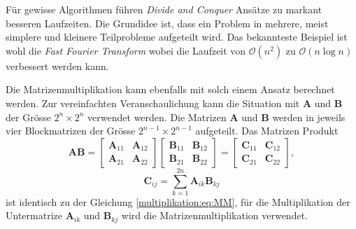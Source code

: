 F\"ur gewisse Algorithmen f\"uhren \textit{Divide and Conquer}  Ans\"atze \cite{multiplikation:DAC} zu markant besseren Laufzeiten.
Die Grundidee ist, dass ein Problem in mehrere, meist simplere und kleinere Teilprobleme aufgeteilt wird.
Das bekannteste Beispiel ist wohl die \textit{Fast Fourier Transform} wobei die Laufzeit von $\mathcal{O} (n^2)$ zu $\mathcal{O}(n \log n)$ verbessert werden kann.

Die Matrizenmultiplikation kann ebenfalls mit solch einem Ansatz berechnet werden.
Zur vereinfachten Veranschaulichung kann die Situation mit $\mathbf{A}$ und $\mathbf{B}$ der Gr\"osse $2^n \times 2^n$ verwendet werden.
Die Matrizen $\mathbf{A}$ und $\mathbf{B}$ werden in jeweils vier Blockmatrizen der Gr\"osse $2^{n-1} \times 2^{n-1}$ aufgeteilt.
Das Matrizen Produkt
\begin{equation}
\mathbf{A}\mathbf{B}=
\begin{bmatrix}
\mathbf{A}_{11} & \mathbf{A}_{12}\\
\mathbf{A}_{21} & \mathbf{A}_{22}
\end{bmatrix}
\begin{bmatrix}
\mathbf{B}_{11} & \mathbf{B}_{12}\\
\mathbf{B}_{21} & \mathbf{B}_{22}
\end{bmatrix}
=
\begin{bmatrix}
\mathbf{C}_{11} & \mathbf{C}_{12}\\
\mathbf{C}_{21} & \mathbf{C}_{22}
\end{bmatrix},
\end{equation}
\begin{equation}
\mathbf{C}_{ij} = \sum_{k=1}^{2n} \mathbf{A}_{ik} \mathbf{B}_{kj}
\label{multiplikation:eq:MM_block}
\end{equation}
ist identisch zu der Gleichung \eqref{multiplikation:eq:MM}, f\"ur die Multiplikation der Untermatrize $\mathbf{A}_{ik}$ und $\mathbf{B}_{kj}$ wird die Matrizenmultiplikation verwendet.

